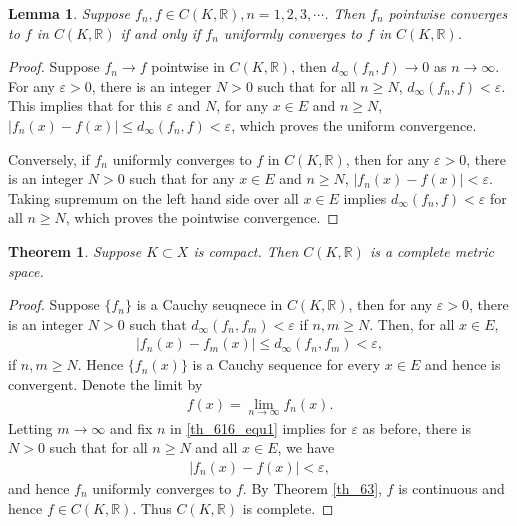 \documentclass[10pt]{book}
\newtheorem{theorem}{Theorem}[chapter]
\newtheorem{lemma}{Lemma}[chapter]
\theoremstyle{definition}
\numberwithin{equation}{chapter}
\begin{document}
\medskip

\begin{lemma}\label{lemma_62}
Suppose $f_n, f \in C(K,\mathbb{R}), n = 1,2,3,\cdots$. Then $f_n$ pointwise converges to $f$ in $C(K,\mathbb{R})$ if and only if $f_n$ uniformly converges to $f$ in $C(K,\mathbb{R})$.
\end{lemma}
\begin{proof}
Suppose $f_n \to f$ pointwise in $C(K,\mathbb{R})$, then $d_{\infty}(f_n,f) \to 0$ as $n \to \infty$. For any $\varepsilon > 0$, there is an integer $N > 0$ such that for all $n \geq N$, $d_{\infty}(f_n,f) < \varepsilon$. This implies that for this $\varepsilon$ and $N$, for any $x \in E$ and $n \geq N$, $\left|f_n(x) - f(x)\right| \leq d_{\infty}(f_n,f) < \varepsilon$, which proves the uniform convergence.

Conversely, if $f_n$ uniformly converges to $f$ in $C(K,\mathbb{R})$, then for any $\varepsilon > 0$, there is an integer $N > 0$ such that for any $x \in E$ and $n \geq N$, $\left|f_n(x) - f(x)\right| < \varepsilon$. Taking supremum on the left hand side over all $x \in E$ implies $d_\infty(f_n,f) < \varepsilon$ for all $n \geq N$, which proves the pointwise convergence.
\end{proof}

\medskip

\begin{theorem}\label{th_616}
Suppose $K \subset X$ is compact. Then $C(K,\mathbb{R})$ is a complete metric space.
\end{theorem}
\begin{proof}
Suppose $\{f_n\}$ is a Cauchy seuqnece in $C(K,\mathbb{R})$, then for any $\varepsilon > 0$, there is an integer $N > 0$ such that $d_{\infty}(f_n,f_m) < \varepsilon$ if $n,m \geq N$. Then, for all $x \in E$, 
\begin{align}\label{th_616_equ1}
    \left|f_n(x) - f_m(x)\right| \leq d_{\infty}(f_n,f_m) < \varepsilon,
\end{align}
if $n,m \geq N$. Hence $\{f_n(x)\}$ is a Cauchy sequence for every $x \in E$ and hence is convergent. Denote the limit by 
\begin{align*}
    f(x) = \lim_{n\to\infty} f_n(x).
\end{align*}
Letting $m \to \infty$ and fix $n$ in \eqref{th_616_equ1} implies for $\varepsilon$ as before, there is $N > 0$ such that for all $n \geq N$ and all $x \in E$, we have
\begin{align*}
    \left|f_n(x) - f(x)\right| < \varepsilon,
\end{align*}
and hence $f_n$ uniformly converges to $f$. By  Theorem \ref{th_63}, $f$ is continuous and hence $f \in C(K,\mathbb{R})$. Thus $C(K,\mathbb{R})$ is complete.
\end{proof}
\end{document}
